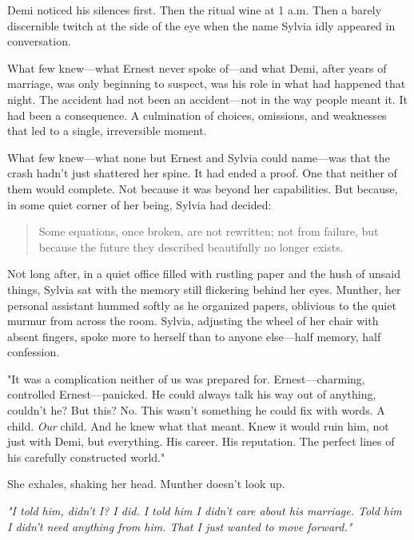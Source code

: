 \bigskip

Demi noticed his silences first. Then the ritual wine at 1 a.m. Then a barely discernible twitch at the side of the eye when the name Sylvia idly appeared in conversation.


What few knew—what Ernest never spoke of—and what Demi, after years of marriage, was only beginning to suspect, was his role in what had happened that night. The accident had not been an accident—not in the way people meant it. It had been a consequence. A culmination of choices, omissions, and weaknesses that led to a single, irreversible moment.

What few knew—what none but Ernest and Sylvia could name—was that the crash hadn’t just shattered her spine. It had ended a proof. One that neither of them would complete. Not because it was beyond her capabilities. But because, in some quiet corner of her being, Sylvia had decided:  

\begin{quote}
Some equations, once broken, are not rewritten; not from failure, but because the future they  described beautifully no longer exists.
\end{quote}

\lettrine{N}ot long after, in a quiet office filled with rustling paper and the hush of unsaid things, Sylvia sat with the memory still flickering behind her eyes. Munther, her personal assistant hummed softly as he organized papers, oblivious to the quiet murmur from across the room. Sylvia, adjusting the wheel of her chair with absent fingers, spoke more to herself than to anyone else—half memory, half confession.


\bigskip

"It was a complication neither of us was prepared for. Ernest—charming, controlled Ernest—panicked. He could always talk his way out of anything, couldn’t he? But this? No. This wasn’t something he could fix with words. A child. \textit{Our} child. And he knew what that meant. Knew it would ruin him, not just with Demi, but everything. His career. His reputation. The perfect lines of his carefully constructed world."

\bigskip

She exhales, shaking her head. Munther doesn’t look up.

\textit{"I told him, didn’t I? I did. I told him I didn’t care about his marriage. Told him I didn’t need anything from him. That I just wanted to move forward."}

\bigskip

